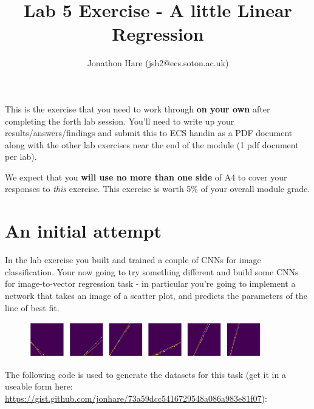 \documentclass[a4paper]{article}
\begin{document}
\lstset{language=Python,upquote=true}

\setlength{\leftskip}{20pt}
\title{Lab 5 Exercise - A little Linear Regression}
\author{Jonathon Hare (jsh2@ecs.soton.ac.uk)}

\maketitle


This is the exercise that you need to work through \textbf{on your own} after completing the forth lab session. You'll need to write up your results/answers/findings and submit this to ECS handin as a PDF document along with the other lab exercises near the end of the module (1 pdf document per lab). 

We expect that you \textbf{will use no more than one side} of A4 to cover your responses to \emph{this} exercise. This exercise is worth 5\% of your overall module grade.

\section{An initial attempt}\label{init}

In the lab exercise you built and trained a couple of CNNs for image classification. Your now going to try something different and build some CNNs for image-to-vector regression task - in particular you're going to implement a network that takes an image of a scatter plot, and predicts the parameters of the line of best fit.

\begin{figure}[h!]
\center
	\includegraphics[width=0.9\textwidth]{plots.png}
\end{figure}

The following code is used to generate the datasets for this task (get it in a useable form here: \url{https://gist.github.com/jonhare/73a59dcc5416729548a086a983e81f07}):
\end{document}
